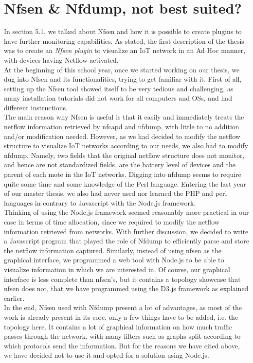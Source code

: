 \section{Nfsen \& Nfdump, not best suited?}

In section 5.1, we talked about Nfsen and how it is possible to create plugins to have further monitoring capabilities. As stated, the first description of the thesis was to create an \textit{Nfsen plugin} to visualize an IoT network in an Ad Hoc manner, with devices having Netflow activated.\\ 

At the beginning of this school year, once we started working on our thesis, we dug into Nfsen and its functionalities, trying to get familiar with it. First of all, setting up the Nfsen tool showed itself to be very tedious and challenging, as many installation tutorials did not work for all computers and OSs, and had different instructions.\\

The main reason why Nfsen is useful is that it easily and immediately treats the netflow information retrieved by nfcapd and nfdump, with little to no addition and/or modification needed. However, as we had decided to modify the netflow structure to visualize IoT networks according to our needs, we also had to modify nfdump. Namely, two fields that the original netflow structure does not monitor, and hence are not standardized fields, are the battery level of devices and the parent of each mote in the IoT networks. Digging into nfdump seems to require quite some time and some knowledge of the Perl language. Entering the last year of our master thesis, we also had never used nor learned the PHP and perl languages in contrary to Javascript with the Node.js framework. \\

Thinking of using the Node.js framework seemed reasonably more practical in our case in terms of time allocation, since we required to modify the netflow information retrieved from networks. With further discussion, we decided to write a Javascript program that played the role of Nfdump to efficiently parse and store the netflow information captured. Similarly, instead of using nfsen as the graphical interface, we programmed a web tool with Node.js to be able to visualize information in which we are interested in. Of course, our graphical interface is less complete than nfsen's, but it contains a topology showcase that nfsen does not, that we have programmed using the D3.js framework as explained earlier.\\

In the end, Nfsen used with Nfdump present a lot of advantages, as most of the work is already present in its core, only a few things have to be added, i.e. the topology here. It contains a lot of graphical information on how much traffic passes through the network, with many filters such as graphs split according to which protocols send the information. But for the reasons we have cited above, we have decided not to use it and opted for a solution using Node.js. 


